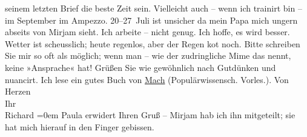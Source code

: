 \begin{ledgroupsized}[t]{13cm}
               seinem letzten Brief die beste Zeit sein.\pend
           \pstart
           Vielleicht auch – wenn ich trainirt bin – im September im Ampezzo. 20–27 Juli
               ist unsicher da mein Papa
               mich ungern abseits von Mirjam sieht. Ich
               arbeite {\pb}– nicht genug. Ich hoffe,
               es wird besser. Wetter ist scheusslich; heute regenlos, aber der Regen ko{\geminationm}t noch.\pend
           \pstart
           Bitte schreiben Sie mir so oft als möglich; wenn man – wie der zudringliche Mime das nennt, keine
               »Ansprache« hat!\pend
           \pstart
           Grüßen Sie wie {\pb}gewöhnlich nach
               Gutdünken und nuancirt. Ich lese ein gutes Buch von \uline{Mach} (Populärwissensch. Vorles.).\pend
           \pstart
           Von Herzen{\\[\baselineskip]}Ihr{\\[\baselineskip]}\spacefill\mbox{Richard}\pend
           \leftskip=0em{}\pstart
           \noindent{}Paula erwidert Ihren Gruß – Mirjam hab ich ihn mitgeteilt; sie hat mich
                  hierauf in den Finger gebissen.\pend
           
         
         \endnumbering{}\end{ledgroupsized}  \newcommand{\dateiname}{L00807}\newcommand{\titel}{Richard Beer-Hofmann an Arthur Schnitzler, 18. 6. 1898}\newcommand{\editorInnen}{Martin Anton Müller und Gerd-Hermann Susen}
      